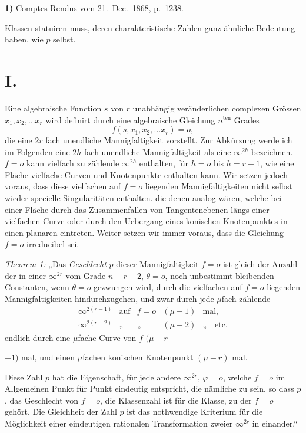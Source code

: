 \documentclass{article}
\begin{document}
\textbf{1)} Comptes Rendus vom 21.\ Dec.\ 1868, p.\ 1238.

Klassen statuiren muss, deren charakteristische Zahlen ganz ähnliche Bedeutung haben, wie $p$ selbst.

\section*{I.}

Eine algebraische Function $s$ von $r$ unabhängig veränderlichen complexen Grössen $x_1, x_2, \ldots x_r$ wird definirt durch eine algebraische Gleichung $n^{\text{ten}}$ Grades
\[ f(s, x_1, x_2, \ldots x_r) = o, \]
die eine $2r$ fach unendliche Mannigfaltigkeit vorstellt. Zur Abkürzung werde ich im Folgenden eine $2h$ fach unendliche Mannigfaltigkeit als eine $\infty^{2h}$ bezeichnen. $f = o$ kann vielfach zu zählende $\infty^{2h}$ enthalten, für $h = o$ bis $h = r - 1$, wie eine Fläche vielfache Curven und Knotenpunkte enthalten kann. Wir setzen jedoch voraus, dass diese vielfachen auf $f = o$ liegenden Mannigfaltigkeiten nicht selbst wieder specielle Singularitäten enthalten. die denen analog wären, welche bei einer Fläche durch das Zusammenfallen von Tangentenebenen längs einer vielfachen Curve oder durch den Uebergang eines konischen Knotenpunktes in einen planaren eintreten. Weiter setzen wir immer voraus, dass die Gleichung $f = o$ irreducibel sei.

\emph{Theorem 1:} „Das \emph{Geschlecht} $p$ dieser Mannigfaltigkeit $f = o$ ist gleich der Anzahl der in einer $\infty^{2r}$ vom Grade $n - r - 2$, $\theta = o$, noch unbestimmt bleibenden Constanten, wenn $\theta = o$ gezwungen wird, durch die vielfachen auf $f = o$ liegenden Mannigfaltigkeiten hindurchzugehen, und zwar durch jede $\mu$fach zählende
\[
\begin{array}{lllll}
\infty^{2(r-1)} & \text{auf} & f = o & (\mu - 1) & \text{mal,}\\
\infty^{2(r-2)} & \text{„} & \text{„} & (\mu - 2) & \text{„}\quad\text{etc.}
\end{array}
\]
endlich durch eine $\mu$fache Curve von $f$ $(\mu - r$

$+ 1)$ mal, und einen $\mu$fachen konischen Knotenpunkt $(\mu - r)$ mal.

Diese Zahl $p$ hat die Eigenschaft, für jede andere $\infty^{2r}$, $\varphi = o$, welche $f = o$ im Allgemeinen Punkt für Punkt eindeutig entspricht, die nämliche zu sein, so dass $p$, das Geschlecht von $f = o$, die Klassenzahl ist für die Klasse, zu der $f = o$ gehört. Die Gleichheit der Zahl $p$ ist das nothwendige Kriterium für die Möglichkeit einer eindeutigen rationalen Transformation zweier $\infty^{2r}$ in einander.“
\end{document}
